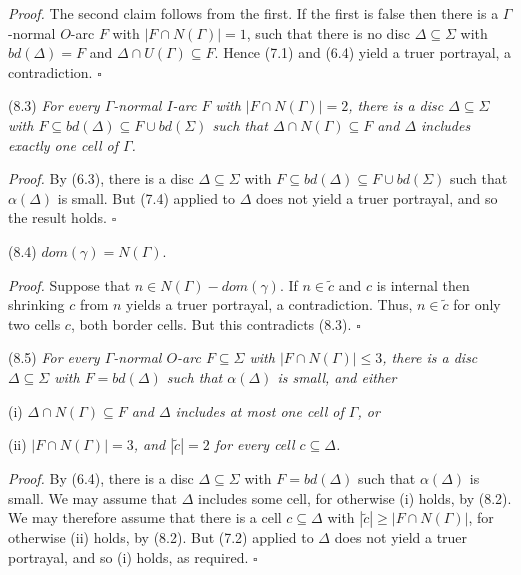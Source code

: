 \textit{Proof.} The second claim follows from the first. If the first is false then there is a $\Gamma$-normal $O$-arc $F$ with $|F \cap N(\Gamma)| = 1$, such that there is no disc $\Delta \subseteq \Sigma$ with $bd(\Delta) = F$ and $\Delta \cap U(\Gamma) \subseteq F$. Hence (7.1) and (6.4) yield a truer portrayal, a contradiction. $\square$

\stmt
(8.3) \textit{For every $\Gamma$-normal $I$-arc $F$ with $|F \cap N(\Gamma)| = 2$, there is a disc $\Delta \subseteq \Sigma$ with $F \subseteq bd(\Delta) \subseteq F \cup bd(\Sigma)$ such that $\Delta \cap N(\Gamma) \subseteq F$ and $\Delta$ includes exactly one cell of $\Gamma$.}

\textit{Proof.} By (6.3), there is a disc $\Delta \subseteq \Sigma$ with $F \subseteq bd(\Delta) \subseteq F \cup bd(\Sigma)$ such that $\alpha(\Delta)$ is small. But (7.4) applied to $\Delta$ does not yield a truer portrayal, and so the result holds. $\square$

\stmt
(8.4) $dom(\gamma) = N(\Gamma)$.

\textit{Proof.} Suppose that $n \in N(\Gamma) - dom(\gamma)$. If $n \in \tilde{c}$ and $c$ is internal then shrinking $c$ from $n$ yields a truer portrayal, a contradiction. Thus, $n \in \tilde{c}$ for only two cells $c$, both border cells. But this contradicts (8.3). $\square$

\stmt
(8.5) \textit{For every $\Gamma$-normal $O$-arc $F \subseteq \Sigma$ with $|F \cap N(\Gamma)| \le 3$, there is a disc $\Delta \subseteq \Sigma$ with $F = bd(\Delta)$ such that $\alpha(\Delta)$ is small, and either}

\hspace*{12pt}(i) \textit{$\Delta \cap N(\Gamma) \subseteq F$ and $\Delta$ includes at most one cell of $\Gamma$, or}

\hspace*{12pt}(ii) \textit{$|F \cap N(\Gamma)| = 3$, and $|\tilde{c}| = 2$ for every cell $c \subseteq \Delta$.}

\textit{Proof.} By (6.4), there is a disc $\Delta \subseteq \Sigma$ with $F = bd(\Delta)$ such that $\alpha(\Delta)$ is small. We may assume that $\Delta$ includes some cell, for otherwise (i) holds, by (8.2). We may therefore assume that there is a cell $c \subseteq \Delta$ with $|\tilde{c}| \ge |F \cap N(\Gamma)|$, for otherwise (ii) holds, by (8.2). But (7.2) applied to $\Delta$ does not yield a truer portrayal, and so (i) holds, as required. $\square$

